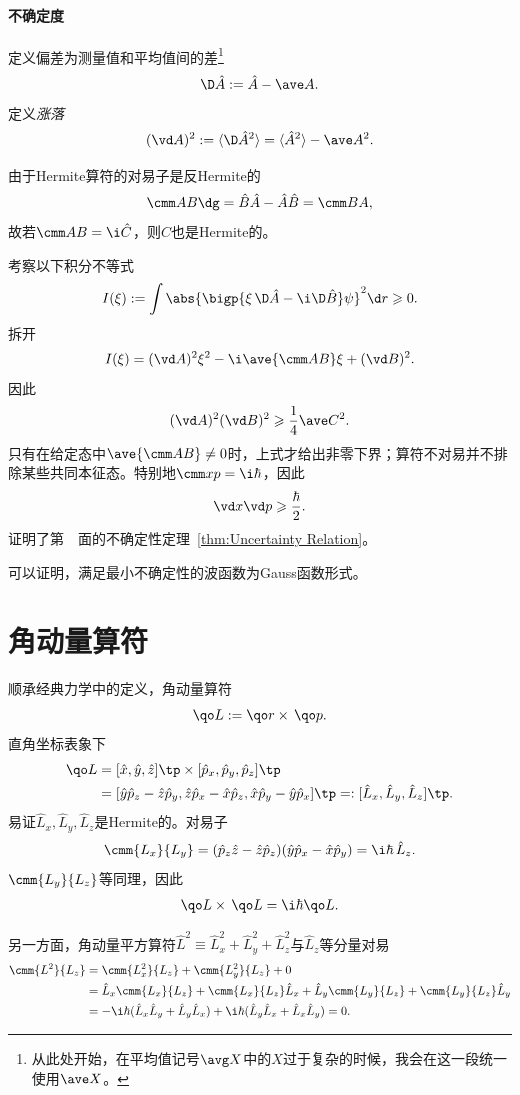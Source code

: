 \paragraph{不确定度}定义偏差为测量值和平均值间的差\footnote{从此处开始，在平均值记号$\avg X$中的$X$过于复杂的时候，我会在这一段统一使用$\ave X$。}
\[
	\D\hat A:=\hat A-\ave A.
\]
定义\textit{涨落}
\[
	(\vd A)^2:=\langle\D\hat A^2\rangle=\langle\hat A^2\rangle-\ave A^2.
\]

由于Hermite算符的对易子是反Hermite的
\[
	\cmm AB\dg=\hat B\hat A-\hat A\hat B=\cmm BA,
\]
故若$\cmm AB=\i\hat C$，则$\hat C$也是Hermite的。

考察以下积分不等式
\[
I(\xi):=\int\abs{\bigp{\xi\,\D\hat A-\i\D\hat B}\psi}^2\d r\geqslant 0.
\]
拆开
\[
I(\xi)=(\vd A)^2\xi^2-\i\ave{\cmm AB}\xi+(\vd B)^2.
\]
因此
\begin{align}
	(\vd A)^2(\vd B)^2\geqslant\frac14\ave C^2.
\end{align}
只有在给定态中$\ave{\cmm AB}\neq0$时，上式才给出非零下界；算符不对易并不排除某些共同本征态。特别地$\cmm xp=\i\hbar$，因此
\begin{align}
	\vd x\vd p\geqslant\frac{\hbar}2.\label{Proof of UR}
\end{align}
证明了第~\pageref{thm:Uncertainty Relation}~面的不确定性定理~\ref{thm:Uncertainty Relation}。

可以证明，满足最小不确定性的波函数为Gauss函数形式。
\section{角动量算符}
顺承经典力学中的定义，角动量算符
\[
	\qo L:=\qo r\times\,\qo p.
\]
直角坐标表象下
\begin{align*}
	\qo L & =[\hat x,\hat y,\hat z]\tp\times[\hat p_x,\hat p_y,\hat p_z]\tp                             \\
	      & =[\hat y\hat p_z-\hat z\hat p_y,\hat z\hat p_x-\hat x\hat p_z,\hat x\hat p_y-\hat y\hat p_x]\tp %
	=:[\hat L_x,\hat L_y,\hat L_z]\tp.
\end{align*}
易证$\hat L_x,\hat L_y,\hat L_z$是Hermite的。对易子
\[
	\cmm{L_x}{L_y}=(\hat p_z\hat z-\hat z\hat p_z)(\hat y\hat p_x-\hat x\hat p_y)=\i\hbar\,\hat L_z.
\]
$\cmm{L_y}{L_z}$等同理，因此
\begin{align}
	\qo L\times\,\qo L=\i\hbar\qo L.
\end{align}

另一方面，角动量平方算符$\hat L^2\equiv\hat L_x^2+\hat L_y^2+\hat L_z^2$与$\hat L_z$等分量对易
\begin{align}\notag
	\cmm{L^2}{L_z}&=\cmm{L^2_x}{L_z}+\cmm{L^2_y}{L_z}+0\\\notag
	&=\hat L_x\cmm{L_x}{L_z}+\cmm{L_x}{L_z}\hat L_x+\hat L_y\cmm{L_y}{L_z}+\cmm{L_y}{L_z}\hat L_y\\
	&=-\i\hbar(\hat L_x\hat L_y+\hat L_y\hat L_x)+\i\hbar(\hat L_y\hat L_x+\hat L_x\hat L_y)=0.
\end{align}


